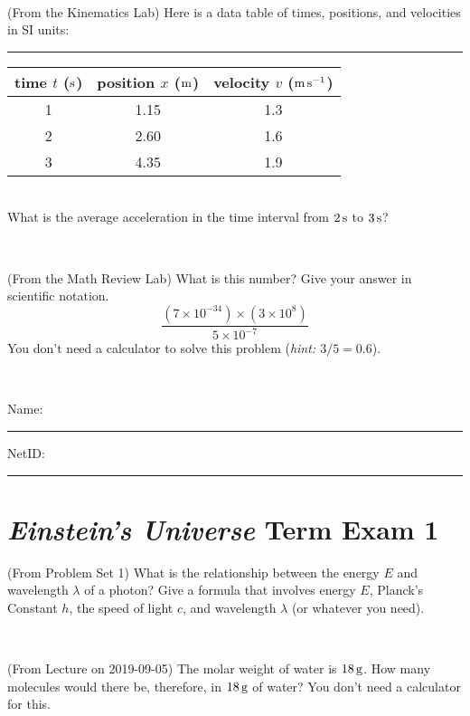 \documentclass[12pt, letterpaper]{article}
\begin{document}
\vfill ~

\begin{problem} (From the Kinematics Lab)
Here is a data table of times, positions, and velocities in SI units:\\
\rule{1.0in}{0pt}\begin{tabular}{c|c|c}
time $t$ ($\mathrm{s}$) & position $x$ ($\mathrm{m}$) & velocity $v$ ($\mathrm{m}\,\mathrm{s}^{-1}$) \\
\hline
1 & 1.15 & 1.3 \\
2 & 2.60 & 1.6 \\
3 & 4.35 & 1.9 \\
\hline
\end{tabular}\\
What is the average acceleration in the time interval from $2\,\mathrm{s}$ to $3\,\mathrm{s}$?
\end{problem}


\vfill ~

\begin{problem} (From the Math Review Lab)
What is this number? Give your answer in scientific notation.
$$
\frac{(7\times10^{-34})\times(3\times10^8)}{5\times10^{-7}}
$$
You don't need a calculator to solve this problem (\textit{hint: $3/5=0.6$}).
\end{problem}


\vfill ~


\cleardoublepage



\noindent
Name: \rule[-1ex]{0.60\textwidth}{0.1pt}
NetID: \rule[-1ex]{0.20\textwidth}{0.1pt}

\section*{\textsl{Einstein's Universe} Term Exam 1}
\setcounter{problem}{1}


\begin{problem} (From Problem Set 1)
What is the relationship between the energy $E$ and wavelength
$\lambda$ of a photon? Give a formula that involves energy $E$,
Planck's Constant $h$, the speed of light $c$, and wavelength
$\lambda$ (or whatever you need).
\end{problem}

\vfill ~

\begin{problem} (From Lecture on 2019-09-05)
The molar weight of water is $18\,\mathrm{g}$. How many molecules would there
be, therefore, in $18\,\mathrm{g}$ of water? You don't need a calculator for
this.
\end{problem}
\end{document}

